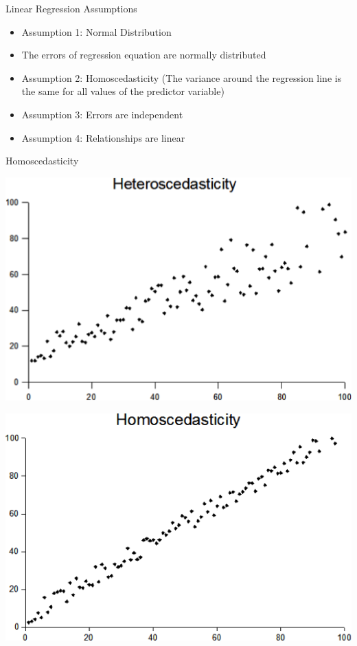 \documentclass[table,smaller]{beamer}
\begin{document}
\begin{frame}[label=sec-2-6]{Linear Regression Assumptions}
\begin{itemize}
\item Assumption 1: Normal Distribution
\item The errors of regression equation are normally distributed
\item Assumption 2: Homoscedasticity (The variance around the regression line is the same for all values of the predictor variable)
\item Assumption 3: Errors are independent
\item Assumption 4: Relationships are linear
\end{itemize}
\end{frame}
\begin{frame}[label=sec-2-7]{Homoscedasticity}
{\center
\includegraphics[width=.5\textwidth]{images/heteroscedasticity.png}

\includegraphics[width=.5\textwidth]{images/homscedasticity.png}

}
\end{frame}
\end{document}
